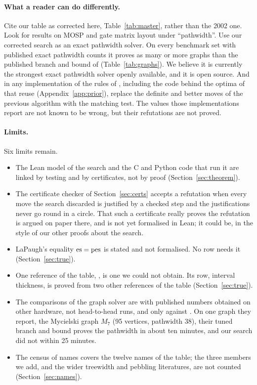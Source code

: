 \paragraph{What a reader can do differently.} Cite our table as corrected here,
Table~\ref{tab:master}, rather than the 2002 one. Look for results on MOSP and
gate matrix layout under ``pathwidth''. Use our corrected search as an exact
pathwidth solver. On every benchmark set with published exact pathwidth counts
it proves as many or more graphs than the published branch and bound of
\citet{CoudertMazauricNisse2016} (Table~\ref{tab:graphs}). We believe it is
currently the strongest exact pathwidth solver openly available, and it is open
source. And in any implementation of the rules
of \citet{ChuStuckey2009}, including the code behind the optima of
\citet{Frinhani2018} that \citet{MartinYanassePinto2022} reuse
(Appendix~\ref{app:prior}), replace the definite and better moves of the previous algorithm
with the matching test. The values those implementations report are not known
to be wrong, but their refutations are not proved.

\paragraph{Limits.} Six limits remain.
\begin{itemize}
\item The Lean model of the search and the C and Python code that run it are
  linked by testing and by certificates, not by proof
  (Section~\ref{sec:theorem}).
\item The certificate checker of Section~\ref{sec:certs} accepts a refutation
  when every move the search discarded is justified by a checked step and the
  justifications never go round in a circle. That such a certificate really
  proves the refutation is argued on paper there, and is not yet formalised in
  Lean; it could be, in the style of our other proofs about the search.
\item LaPaugh's equality $\mathrm{es}=\mathrm{pes}$ is stated and not formalised. No row
  needs it (Section~\ref{sec:true}).
\item One reference of the table, \citet{LY2002ref5}, is one we could not obtain. Its row,
  interval thickness, is proved from two other
  references of the table
  (Section~\ref{sec:true}).
\item The comparisons of the graph solver are with published numbers obtained
  on other hardware, not head-to-head runs, and only against
  \citet{CoudertMazauricNisse2016}. On one graph they report, the Mycielski
  graph $M_7$ (95 vertices, pathwidth 38), their tuned branch and bound proves
  the pathwidth in about ten minutes, and our search did not within 25 minutes.
\item The census of names covers the twelve names of the table; the three
  members we add, and the wider treewidth and pebbling literatures, are not
  counted (Section~\ref{sec:names}).
\end{itemize}

